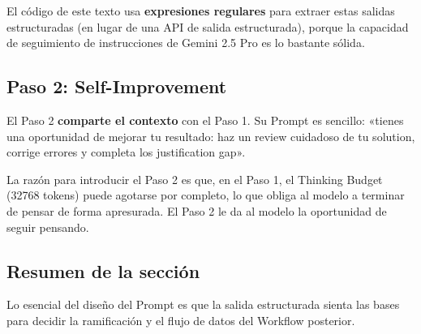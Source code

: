 El código de este texto usa \textbf{expresiones regulares} para extraer estas salidas estructuradas (en lugar de una API de salida estructurada), porque la capacidad de seguimiento de instrucciones de Gemini 2.5 Pro es lo bastante sólida.

\subsection{Paso 2: Self-Improvement}

El Paso 2 \textbf{comparte el contexto} con el Paso 1. Su Prompt es sencillo: «tienes una oportunidad de mejorar tu resultado: haz un review cuidadoso de tu solution, corrige errores y completa los justification gap».

La razón para introducir el Paso 2 es que, en el Paso 1, el Thinking Budget (32768 tokens) puede agotarse por completo, lo que obliga al modelo a terminar de pensar de forma apresurada. El Paso 2 le da al modelo la oportunidad de seguir pensando.

\subsection{Resumen de la sección}

Lo esencial del diseño del Prompt es que la salida estructurada sienta las bases para decidir la ramificación y el flujo de datos del Workflow posterior.
